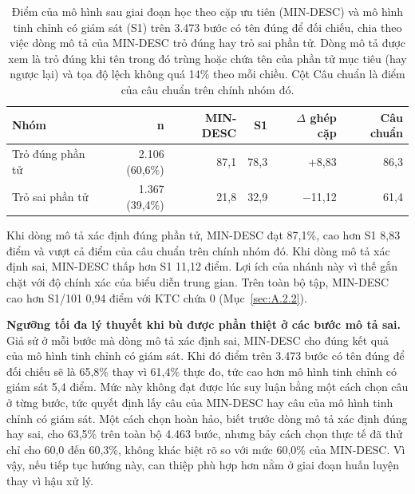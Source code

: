 \begin{table}[htbp]
\centering\small
\caption[Điểm của mô hình sau giai đoạn học theo cặp ưu tiên (MIN-DESC) và mô hình tinh chỉnh có giám sát (S1) trên 3.473 bước có tên đúng để đối chiếu, chia theo việc dòng mô tả của MIN-DESC trỏ đúng hay trỏ sai phần tử.]{Điểm của mô hình sau giai đoạn học theo cặp ưu tiên (MIN-DESC) và mô hình tinh chỉnh có giám sát (S1) trên 3.473 bước có tên đúng để đối chiếu, chia theo việc dòng mô tả của MIN-DESC trỏ đúng hay trỏ sai phần tử. Dòng mô tả được xem là trỏ đúng khi tên trong đó trùng hoặc chứa tên của phần tử mục tiêu (hay ngược lại) và tọa độ lệch không quá 14\% theo mỗi chiều. Cột Câu chuẩn là điểm của câu chuẩn trên chính nhóm đó.}\label{tab:A.6}
\begin{tabular}{@{}lrrrrr@{}}
\toprule
\textbf{Nhóm} & \textbf{n} & \textbf{MIN-DESC} & \textbf{S1} & \textbf{$\Delta$ ghép cặp} & \textbf{Câu chuẩn} \\
\midrule
Trỏ đúng phần tử & 2.106 (60,6\%) & 87,1 & 78,3 & +8,83 & 86,3 \\
Trỏ sai phần tử & 1.367 (39,4\%) & 21,8 & 32,9 & $-$11,12 & 61,4 \\
\bottomrule
\end{tabular}
\end{table}

Khi dòng mô tả xác định đúng phần tử, MIN-DESC đạt 87,1\%, cao hơn S1 8,83 điểm và vượt cả điểm của câu chuẩn trên chính nhóm đó. Khi dòng mô tả xác định sai, MIN-DESC thấp hơn S1 11,12 điểm. Lợi ích của nhánh này vì thế gắn chặt với độ chính xác của biểu diễn trung gian. Trên toàn bộ tập, MIN-DESC cao hơn S1/101 0,94 điểm với KTC chứa 0 (Mục~\ref{sec:A.2.2}).

\textbf{Ngưỡng tối đa lý thuyết khi bù được phần thiệt ở các bước mô tả sai.} Giả sử ở mỗi bước mà dòng mô tả xác định sai, MIN-DESC cho đúng kết quả của mô hình tinh chỉnh có giám sát. Khi đó điểm trên 3.473 bước có tên đúng để đối chiếu sẽ là 65,8\% thay vì 61,4\% thực đo, tức cao hơn mô hình tinh chỉnh có giám sát 5,4 điểm. Mức này không đạt được lúc suy luận bằng một cách chọn câu ở từng bước, tức quyết định lấy câu của MIN-DESC hay câu của mô hình tinh chỉnh có giám sát. Một cách chọn hoàn hảo, biết trước dòng mô tả xác định đúng hay sai, cho 63,5\% trên toàn bộ 4.463 bước, nhưng bảy cách chọn thực tế đã thử chỉ cho 60,0 đến 60,3\%, không khác biệt rõ so với mức 60,0\% của MIN-DESC. Vì vậy, nếu tiếp tục hướng này, can thiệp phù hợp hơn nằm ở giai đoạn huấn luyện thay vì hậu xử lý.

